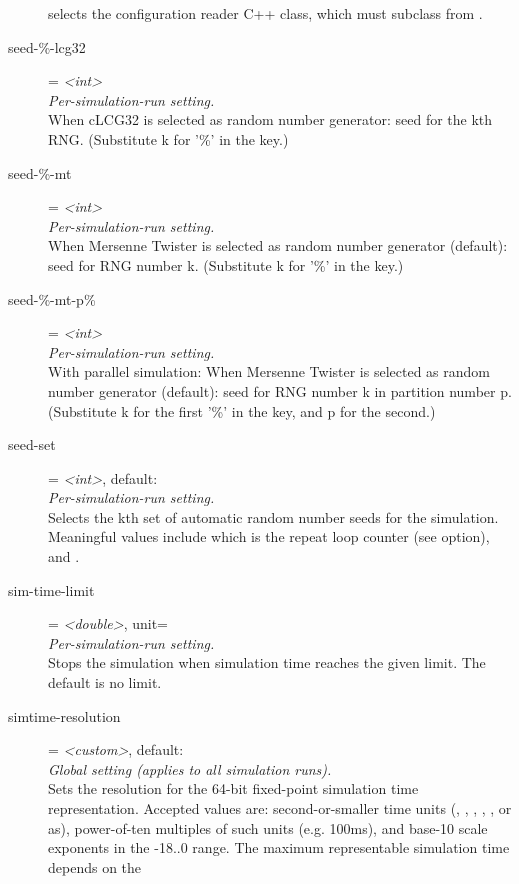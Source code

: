 \begin{description}
    selects the configuration reader C++ class, which must subclass from
    .
\item[seed-\%-lcg32] = \textit{<int>}\\
    \textit{Per-simulation-run setting.}\\
    When cLCG32 is selected as random number generator: seed for the kth RNG.
    (Substitute k for '\%' in the key.)
\item[seed-\%-mt] = \textit{<int>}\\
    \textit{Per-simulation-run setting.}\\
    When Mersenne Twister is selected as random number generator (default):
    seed for RNG number k. (Substitute k for '\%' in the key.)
\item[seed-\%-mt-p\%] = \textit{<int>}\\
    \textit{Per-simulation-run setting.}\\
    With parallel simulation: When Mersenne Twister is selected as random
    number generator (default): seed for RNG number k in partition number p.
    (Substitute k for the first '\%' in the key, and p for the second.)
\item[seed-set] = \textit{<int>}, default: \\
    \textit{Per-simulation-run setting.}\\
    Selects the kth set of automatic random number seeds for the simulation.
    Meaningful values include 
    which is the repeat loop counter (see  option), and
    .
\item[sim-time-limit] = \textit{<double>}, unit=\\
    \textit{Per-simulation-run setting.}\\
    Stops the simulation when simulation time reaches the given limit. The
    default is no limit.
\item[simtime-resolution] = \textit{<custom>}, default: \\
    \textit{Global setting (applies to all simulation runs).}\\
    Sets the resolution for the 64-bit fixed-point simulation time
    representation. Accepted values are: second-or-smaller time units (,
    , , , ,  or as), power-of-ten
    multiples of such units (e.g. 100ms), and base-10 scale exponents in the
    -18..0 range. The maximum representable simulation time depends on the

\end{description}
